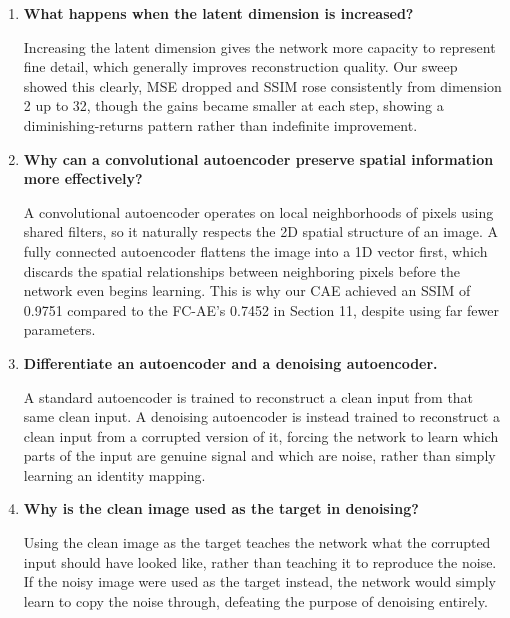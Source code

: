 \documentclass[10pt]{article}
\begin{document}
\begin{enumerate}
The bottleneck does not have enough capacity to represent every input uniquely, so the decoder ends up producing the closest approximate output rather than the correct one. This is supported directly by our latent-dimension sweep in Section 27, where reducing the FC-AE's latent size to 2 lowered SSIM to about 0.45 and raised MSE to about 0.048, both noticeably worse than the 16-dimensional baseline. This also matches the reconstruction failure seen in Plot 1, where a 5 was reconstructed as a 6 due to insufficient latent capacity.

\item \textbf{What happens when the latent dimension is increased?}

Increasing the latent dimension gives the network more capacity to represent fine detail, which generally improves reconstruction quality. Our sweep showed this clearly, MSE dropped and SSIM rose consistently from dimension 2 up to 32, though the gains became smaller at each step, showing a diminishing-returns pattern rather than indefinite improvement.

\item \textbf{Why can a convolutional autoencoder preserve spatial information more effectively?}

A convolutional autoencoder operates on local neighborhoods of pixels using shared filters, so it naturally respects the 2D spatial structure of an image. A fully connected autoencoder flattens the image into a 1D vector first, which discards the spatial relationships between neighboring pixels before the network even begins learning. This is why our CAE achieved an SSIM of 0.9751 compared to the FC-AE's 0.7452 in Section 11, despite using far fewer parameters.

\item \textbf{Differentiate an autoencoder and a denoising autoencoder.}

A standard autoencoder is trained to reconstruct a clean input from that same clean input. A denoising autoencoder is instead trained to reconstruct a clean input from a corrupted version of it, forcing the network to learn which parts of the input are genuine signal and which are noise, rather than simply learning an identity mapping.

\item \textbf{Why is the clean image used as the target in denoising?}

Using the clean image as the target teaches the network what the corrupted input should have looked like, rather than teaching it to reproduce the noise. If the noisy image were used as the target instead, the network would simply learn to copy the noise through, defeating the purpose of denoising entirely.


\end{enumerate}
\end{document}
